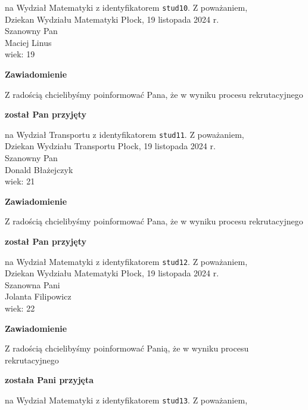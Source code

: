 \documentclass[12pt,a4paper]{article}
\begin{document}
na Wydział Matematyki z identyfikatorem \verb|stud10|. 
\vspace{2cm}
\noindent
Z poważaniem, \\
Dziekan
Wydziału Matematyki
\newpage
\hfill Płock, 19 listopada 2024 r. \\
\noindent
Szanowny Pan \\
Maciej Linus \\
wiek: 19
\bigskip
\begin{center}
    {\Large\textbf{Zawiadomienie}}
\end{center}
\bigskip 
Z radością chcielibyśmy poinformować Pana, że w wyniku procesu rekrutacyjnego
\begin{center}
\textsf{\textbf{został Pan przyjęty}}
\end{center}
na Wydział Transportu z identyfikatorem \verb|stud11|. 
\vspace{2cm}
\noindent
Z poważaniem, \\
Dziekan
Wydziału Transportu
\newpage
\hfill Płock, 19 listopada 2024 r. \\
\noindent
Szanowny Pan \\
Donald Błażejczyk \\
wiek: 21
\bigskip
\begin{center}
    {\Large\textbf{Zawiadomienie}}
\end{center}
\bigskip 
Z radością chcielibyśmy poinformować Pana, że w wyniku procesu rekrutacyjnego
\begin{center}
\textsf{\textbf{został Pan przyjęty}}
\end{center}
na Wydział Matematyki z identyfikatorem \verb|stud12|. 
\vspace{2cm}
\noindent
Z poważaniem, \\
Dziekan
Wydziału Matematyki
\newpage
\hfill Płock, 19 listopada 2024 r. \\
\noindent
Szanowna Pani \\
Jolanta Filipowicz \\
wiek: 22
\bigskip
\begin{center}
    {\Large\textbf{Zawiadomienie}}
\end{center}
\bigskip 
Z radością chcielibyśmy poinformować Panią, że w wyniku procesu rekrutacyjnego
\begin{center}
\textsf{\textbf{została Pani przyjęta}}
\end{center}
na Wydział Matematyki z identyfikatorem \verb|stud13|. 
\vspace{2cm}
\noindent
Z poważaniem, \\
\end{document}

